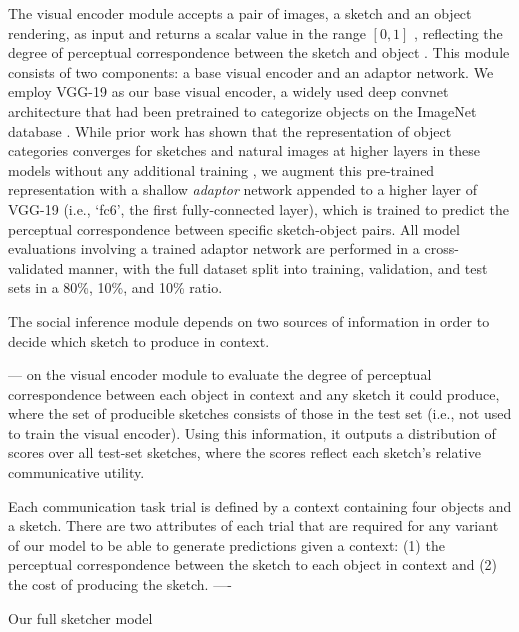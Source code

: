 \documentclass[9pt,twocolumn,twoside]{pnas-new}
\newcommand{\mwu}[1]{{\color{green}{[mwu: #1]}}}
\begin{document}
The visual encoder module accepts a pair of images, a sketch and an object rendering, as input and returns a scalar value in the range $[0,1]$ \mwu{here is where a rigorous definition of encoder could have been useful}, reflecting the degree of perceptual correspondence between the sketch and object \mwu{where 1 represents ...} . This module consists of two components: a base visual encoder and an adaptor network. We employ VGG-19 \cite{simonyan2014very} as our base visual encoder, a widely used deep convnet architecture that had been pretrained to categorize objects on the ImageNet database \cite{deng2009imagenet}. While prior work has shown that the representation of object categories converges for sketches and natural images at higher layers in these models without any additional training \cite{FanCommon2018}, we augment \mwu{this doesnt make too much sense -- why do we train an adaptor if we do not need it? my impression is that we needed this adaptor.} this pre-trained representation with a shallow \textit{adaptor} network appended to a higher layer of VGG-19 (i.e., `fc6', the first fully-connected layer), which is trained to predict the perceptual correspondence between specific sketch-object pairs. All model evaluations involving a trained adaptor network are performed in a cross-validated manner, with the full dataset split into training, validation, and test sets in a 80\%, 10\%, and 10\% ratio.

The social inference module depends on two sources of information in order to decide which sketch to produce in context.

---
on the visual encoder module to evaluate the degree of perceptual correspondence between each object in context and any sketch it could produce, where the set of producible sketches consists of those in the test set (i.e., not used to train the visual encoder). Using this information, it outputs a distribution of scores over all test-set sketches, where the scores reflect each sketch's relative communicative utility.

Each communication task trial is defined by a context containing four objects and a sketch. There are two attributes of each trial that are required for any variant of our model to be able to generate predictions given a context: (1) the perceptual correspondence between the sketch to each object in context and (2) the cost of producing the sketch.
----

Our full sketcher model
\end{document}
